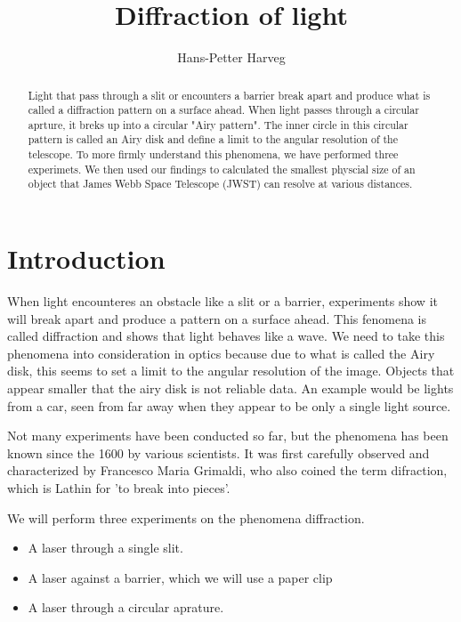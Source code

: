 \documentclass{emulateapj}
\begin{document}
\title{Diffraction of light}

\author{Hans-Petter Harveg}




\begin{abstract}
Light that pass through a slit or encounters a barrier break apart and produce what is called a diffraction pattern on a surface ahead. When light passes through a circular aprture, it breks up into a circular "Airy pattern". The inner circle in this circular pattern is called an Airy disk and define a limit to the angular resolution of the telescope. To more firmly understand this phenomena, we have performed three experimets. We then used our findings to calculated the smallest physcial size of an object that James Webb Space Telescope (JWST) can resolve at various distances.
\end{abstract}


\section{Introduction}
\label{sec:introduction}

When light encounteres an obstacle like a slit or a barrier, experiments show it will break apart and produce a pattern on a surface ahead. This fenomena is called diffraction and shows that light behaves like a wave. We need to take this phenomena into consideration in optics because due to what is called the Airy disk, this seems to set a limit to the angular resolution of the image. Objects that appear smaller that the airy disk is not reliable data. An example would be lights from a car, seen from far away when they appear to be only a single light source.

Not many experiments have been conducted so far, but the phenomena has been known since the 1600 by various scientists. It was first carefully observed and characterized by Francesco Maria Grimaldi, who also coined the term difraction, which is Lathin for 'to break into pieces'.  

We will perform three experiments on the phenomena diffraction.

\begin{itemize}
\item A laser through a single slit.
\item A laser against a barrier, which we will use a paper clip
\item A laser through a circular aprature.
\end{itemize}
\end{document}
